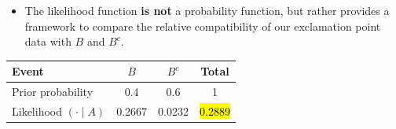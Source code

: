 \documentclass[12pt]{beamer}
\begin{document}
\begin{frame}{}

\begin{block}{}
\begin{itemize}
\item The likelihood function \textbf{is not} a probability function, but rather provides a framework to compare the relative compatibility of our exclamation point data with $B$ and $B^c$.
\end{itemize}
\begin{table}[h]
\centering
\begin{tabular}{lccc}
\hline
\textbf{Event}              & \(B\)  & \(B^c\) & \textbf{Total} \\
\hline
Prior probability           & 0.4    & 0.6     & 1              \\[0.1cm]
Likelihood $(\cdot \mid A)$ & 0.2667 & 0.0232  & \hl{0.2889}    \\
\hline
\end{tabular}
\end{table}
\end{block}
\end{frame}
\end{document}
